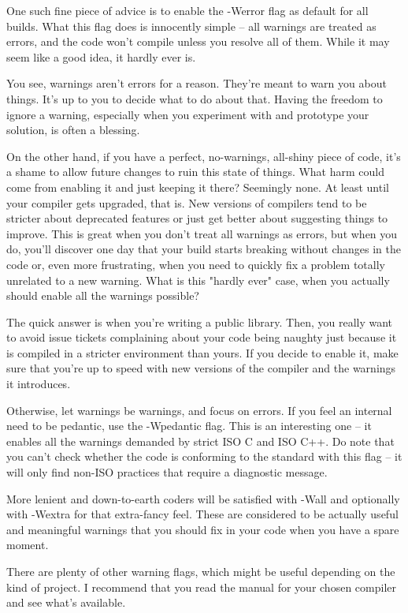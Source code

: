 One such fine piece of advice is to enable the -Werror flag as default for all builds. What this flag does is innocently simple – all warnings are treated as errors, and the code won't compile unless you resolve all of them. While it may seem like a good idea, it hardly ever is.

You see, warnings aren't errors for a reason. They're meant to warn you about things. It's up to you to decide what to do about that. Having the freedom to ignore a warning, especially when you experiment with and prototype your solution, is often a blessing.

On the other hand, if you have a perfect, no-warnings, all-shiny piece of code, it's a shame to allow future changes to ruin this state of things. What harm could come from enabling it and just keeping it there? Seemingly none. At least until your compiler gets upgraded, that is. New versions of compilers tend to be stricter about deprecated features or just get better about suggesting things to improve. This is great when you don't treat all warnings as errors, but when you do, you'll discover one day that your build starts breaking without changes in the code or, even more frustrating, when you need to quickly fix a problem totally unrelated to a new warning. What is this "hardly ever" case, when you actually should enable all the warnings possible?

The quick answer is when you're writing a public library. Then, you really want to avoid issue tickets complaining about your code being naughty just because it is compiled in a stricter environment than yours. If you decide to enable it, make sure that you're up to speed with new versions of the compiler and the warnings it introduces.

Otherwise, let warnings be warnings, and focus on errors. If you feel an internal need to be pedantic, use the -Wpedantic flag. This is an interesting one – it enables all the warnings demanded by strict ISO C and ISO C++. Do note that you can't check whether the code is conforming to the standard with this flag – it will only find non-ISO practices that require a diagnostic message.

More lenient and down-to-earth coders will be satisfied with -Wall and optionally with -Wextra for that extra-fancy feel. These are considered to be actually useful and meaningful warnings that you should fix in your code when you have a spare moment.

There are plenty of other warning flags, which might be useful depending on the kind of project. I recommend that you read the manual for your chosen compiler and see what's available.

